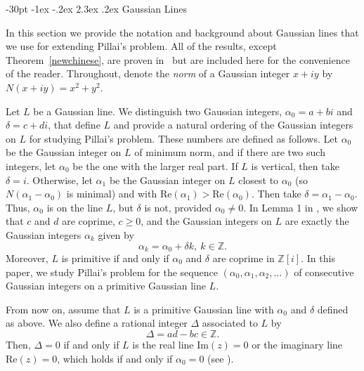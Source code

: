 \documentclass[11pt]{article}
\makeatletter
\renewcommand\section{\@startsection {section}{1}{\z@}
{-30pt \@plus -1ex \@minus -.2ex}
{2.3ex \@plus.2ex}
{\normalfont\normalsize\bfseries\boldmath}}
\newcommand{\Z}{\mathbb{Z}}
\newcommand{\ao}{\alpha_0}
\newcommand{\re}{{\text{Re}}}
\newcommand{\im}{{\text{Im}}}
\makeatother
\begin{document}
 \bigskip
  
 
\section{Gaussian Lines}\label{gaussian}


In this section we provide the notation  and background about Gaussian lines that  we use for extending Pillai's problem.  All of the results, except Theorem~\ref{newchinese}, are proven in~\cite{magness} but are included here for the convenience of the reader. Throughout, denote the {\em norm} of a Gaussian integer $x+iy$ by $N(x+iy)=x^2+y^2$.

Let $L$ be a Gaussian line.  We distinguish two Gaussian integers, $\ao=a+bi$   and $\delta=c+di$, that define $L$ and provide a natural ordering of the Gaussian integers on $L$ for studying Pillai's problem.
These numbers are defined as follows. Let $\ao$ be the Gaussian integer on $L$ of minimum norm, and if there are two such integers, let $\ao $ be the one with the larger real part.  If $L$ is vertical, then take $\delta=i$.  Otherwise, let $\alpha_1$ be the Gaussian integer on $L$ closest to $\ao$ (so  $N(\alpha_1-\ao)$ is minimal) and with $\re(\alpha_1)>\re(\ao)$.  Then take $\delta=\alpha_1-\ao$.  Thus, $\alpha_0$ is on the line $L$, but  $\delta$ is not, provided $\ao\neq 0$. 
In Lemma 1 in \cite{magness}, we show that $c$ and $d$  are  coprime, $c\geq 0$, and  the Gaussian integers  on $L$ are exactly the Gaussian integers $\alpha_k$ given by
\begin{equation}\label{an}\alpha_k=\ao+\delta k,\  k\in\Z.\end{equation}
Moreover, $L$ is primitive if and only if $\ao$ and $\delta$ are coprime in $\Z[i]$.
In this paper, we study Pillai's problem for the sequence 
$(\alpha_0, \alpha_1, \alpha_2,\ldots )$ 
of consecutive Gaussian integers on a primitive Gaussian line $L$.

From now on, assume that $L$ is a primitive Gaussian line with $\ao$ and $\delta$ defined as above.
We also define a rational integer $\Delta$ associated to $L$ by 
\begin{equation}\label{D}\Delta=ad-bc\in\Z.\end{equation}  
Then,  $\Delta=0$ if and only if $L$ is the real line $\im(z)=0$ or the imaginary line $\re(z)=0$, which holds if and only if $\alpha_0=0$ (see \cite[Lemma 2]{magness}).
\end{document}
